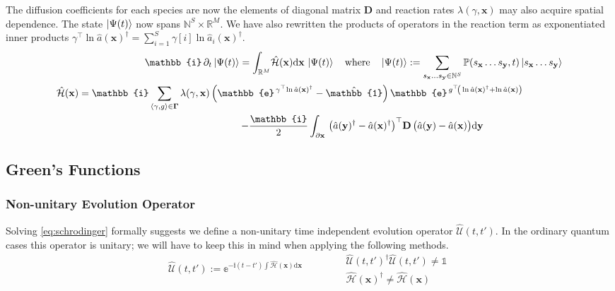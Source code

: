 \documentclass{article}[12pt]
\numberwithin{equation}{section}
\begin{document}
The diffusion coefficients for each species are now the elements
of diagonal matrix $\mathbf{D}$ and reaction rates $\lambda(\gamma,\mathbf{x})$ may also acquire
spatial dependence. The state $\ket{\Psi(t)}$ now spans $\mathbb{N}^S\times\mathbb{R}^M$. We have
also rewritten the products of operators in the reaction term as exponentiated inner products
$\gamma^{\top}\!\ln \hat{a}(\mathbf{x})^{\dagger}=\sum_{i=1}^{S}\gamma[i]\ln\hat{a}_i(\mathbf{x})^{\dagger}$.
\begin{align}
	\mathbb{i}\,\partial_t\ket{\Psi(t)}
	=\int_{\mathbb{R}^M}\!\hat{\mathcal{H}}(\mathbf{x})\mathrm{d}\mathbf{x}\,
	\ket{\Psi(t)}
	\quad\text{where}\quad
	\ket{\Psi(t)}:=\sum_{s_{\mathbf{x}}\dots s_{\mathbf{y}}\in\mathbb{N}^S}
	\mathbb{P}(s_{\mathbf{x}}\dots s_{\mathbf{y}},t)
	\ket{s_{\mathbf{x}}\dots s_{\mathbf{y}}}
	\label{eq:schrodinger}
\\
	\hat{\mathcal{H}}(\mathbf{x}) =
	\mathbb{i}
	\sum_{\langle\gamma,g\rangle\in\mathbf{\Gamma}}
		\lambda(\gamma,\mathbf{x})
		\left(
			\mathbb{e}^{\,\gamma^{\top}\!\ln \hat{a}(\mathbf{x})^{\dagger}}
			-
			\hat{\mathbb{1}}
		\right)
			\mathbb{e}^{\,g^{\top}\!\left(\,
			\ln \hat{a}(\mathbf{x})^{\dagger}+\ln \hat{a}(\mathbf{x})
			\right)}
	\qquad\qquad\\
	-\frac{\mathbb{i}}{2}
	\int_{\partial\mathbf{x}}\,
		\left(\hat{a}(\mathbf{y})^{\dagger}-\hat{a}(\mathbf{x})^{\dagger}\right)^\top
		\!\mathbf{D}\,
		\big(\hat{a}(\mathbf{y})-\hat{a}(\mathbf{x})\big)
	\mathrm{d}\mathbf{y}
	\qquad\qquad\qquad\qquad
	\label{eq:hamiltonian}
\end{align}
\subsection{Green's Functions}\vspace{-10pt}
\subsubsection{Non-unitary Evolution Operator}\vspace{-10pt}
Solving \eqref{eq:schrodinger} formally suggests we define a non-unitary time independent
evolution operator $\hat{\mathcal{U}}(t,t')$. In the ordinary quantum cases this operator is unitary;
we will have to keep this in mind when applying the following methods.
\begin{equation}
\hat{\mathcal{U}}(t,t'):=
	\mathbb{e}^{-\mathbb{i}(t-t')\int\hat{\mathcal{H}}(\mathbf{x})\mathrm{d}\mathbf{x}}
	\qquad\qquad
	\begin{matrix}
		\hat{\mathcal{U}}(t,t')^\dagger\hat{\mathcal{U}}(t,t') \neq \mathbb{1}\\
		\hat{\mathcal{H}}(\mathbf{x})^\dagger \neq \hat{\mathcal{H}}(\mathbf{x})
	\end{matrix}
	\label{eq:evolutionoperator}
\end{equation}
\end{document}
